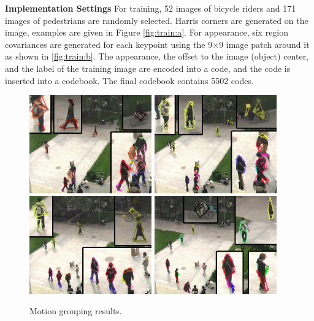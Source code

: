 \textbf{Implementation Settings} For training, 52 images of bicycle riders and 171 images of pedestrians are randomly selected. Harris corners are generated on the image, examples are given in Figure \ref{fig:train:a}. For appearance, six region covariances are generated for each keypoint using the 9$\times$9 image patch around it as shown in \ref{fig:train:b}. The appearance, the offset to the image (object) center, and the label of the training image are encoded into a code, and the code is inserted into a codebook. The final codebook contains 5502 codes.

\begin{figure}
\centering
\includegraphics[width=0.47\textwidth,bb=0 0 720 576]{a16.jpg}
\includegraphics[width=0.47\textwidth,bb=0 0 720 576]{a26.jpg}
\includegraphics[width=0.47\textwidth,bb=0 0 720 576]{a71.jpg}
\includegraphics[width=0.47\textwidth,bb=0 0 720 576]{a116.jpg}
\caption[Motion grouping results]{Motion grouping results.}
\label{fig:mgr}
\end{figure}



